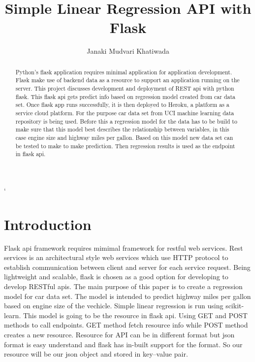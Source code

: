 \title{Simple Linear Regression API with Flask}



\author{Janaki Mudvari Khatiwada}


\renewcommand{\shortauthors}{J. M. Khatiwada}



\begin{abstract}
  Python's flask application requires minimal application for application
  development. Flask make use of backend data as a resource to support an
  application running on the server. This project discusses development
  and deployment of REST api with python flask. This flask api gets predict
  info based on regression model created from car data set. Once flask app runs 
  successfully, it is then deployed to Heroku, a platform as a service 
  cloud platform. For the purpose car data set from UCI machine learning
  data repository is being used. Before this a regression model for the
  data has to be build to make sure that this model best describes the 
  relationship between variables, in this case engine size and highway
  miles per gallon. Based on this model new data set can be tested to make 
  to make prediction. Then regression results is used as the endpoint 
  in flask api.
   
\end{abstract}



\maketitle`

\section{Introduction}
  Flask api framework requires mimimal framework for restful web services.
  Rest services is an architectural style web services which use HTTP protocol
  to establish communication between client and server for each service request.
  Being lightweight and scalable, flask is chosen as a good option for 
  developing to develop RESTful apis. The main purpose of this paper is
  to create a regression model for car data set. The model is intended to
  predict highway miles per gallon based on engine size of the vechicle.
  Simple linear regression is run using scikit-learn. This model is going
  to be the resource in flask api. Using GET and POST methods to call
  endpoints. GET method fetch resource info while POST method creates
  a new resource. Resource for API can be in different format but json format
  is easy understand and flask has in-built support for the format. So 
  our resource will be our json object and stored in key--value pair.
  
